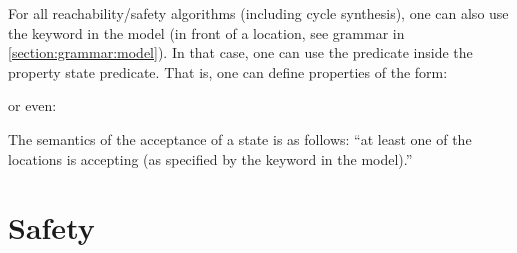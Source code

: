 \begin{remark}\label{remark:accepting}
	For all reachability/safety algorithms (including cycle synthesis), one can also use the  keyword in the model (in front of a location, see grammar in \cref{section:grammar:model}).
	In that case, one can use the  predicate inside the property state predicate.
	That is, one can define properties of the form:

	
	or even:
	
	
	The semantics of the acceptance of a state is as follows: ``at least one of the locations is accepting (as specified by the  keyword in the model).''
	
% 	
\end{remark}

% 	
% 	
% 	
% 	



\section{Safety}\label{ss:mode:EF}

